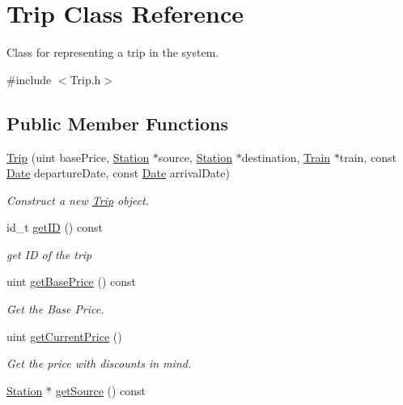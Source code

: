 \hypertarget{classTrip}{}\section{Trip Class Reference}
\label{classTrip}


Class for representing a trip in the system.  




{\ttfamily \#include $<$Trip.\+h$>$}

\subsection*{Public Member Functions}
\begin{DoxyCompactItemize}
\item 
\mbox{\hyperlink{classTrip_a2f799d60e9d2fa7d0e63a0e96b57f731}{Trip}} (uint base\+Price, \mbox{\hyperlink{classStation}{Station}} $\ast$source, \mbox{\hyperlink{classStation}{Station}} $\ast$destination, \mbox{\hyperlink{classTrain}{Train}} $\ast$train, const \mbox{\hyperlink{classDate}{Date}} departure\+Date, const \mbox{\hyperlink{classDate}{Date}} arrival\+Date)
\begin{DoxyCompactList}\small\item\em Construct a new \mbox{\hyperlink{classTrip}{Trip}} object. \end{DoxyCompactList}\item 
id\+\_\+t \mbox{\hyperlink{classTrip_a7770a61e1211789c80b003eeedcaa09c}{get\+ID}} () const
\begin{DoxyCompactList}\small\item\em get ID of the trip \end{DoxyCompactList}\item 
uint \mbox{\hyperlink{classTrip_af2a3a9f9e33b9dd31e9193cf48bec134}{get\+Base\+Price}} () const
\begin{DoxyCompactList}\small\item\em Get the Base Price. \end{DoxyCompactList}\item 
uint \mbox{\hyperlink{classTrip_a9006732aa32a2b098538d48b63f2d276}{get\+Current\+Price}} ()
\begin{DoxyCompactList}\small\item\em Get the price with discounts in mind. \end{DoxyCompactList}\item 
\mbox{\hyperlink{classStation}{Station}} $\ast$ \mbox{\hyperlink{classTrip_a65b45d4816c85d47ef743e7c1cfe807f}{get\+Source}} () const

\end{DoxyCompactItemize}
